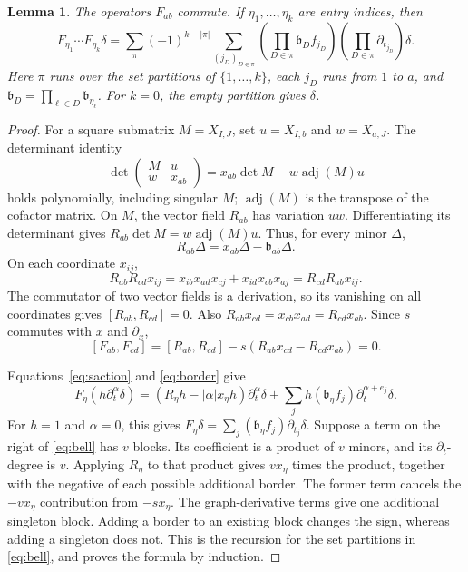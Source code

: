 \documentclass[11pt,a4paper]{article}
\numberwithin{equation}{section}
\newtheorem{lemma}[theorem]{Lemma}
\theoremstyle{definition}
\begin{document}
\begin{lemma}\label{lem:bell}
The operators $F_{ab}$ commute. If $\eta_1,\ldots,\eta_k$ are entry
indices, then
\begin{equation}\label{eq:bell}
F_{\eta_1}\cdots F_{\eta_k}\delta
=\sum_\pi(-1)^{k-|\pi|}
 \sum_{(j_D)_{D\in\pi}}
 \left(\prod_{D\in\pi}\mathfrak b_D f_{j_D}\right)
 \left(\prod_{D\in\pi}\partial_{t_{j_D}}\right)\delta.
\end{equation}
Here $\pi$ runs over the set partitions of $\{1,\ldots,k\}$,
each $j_D$ runs from $1$ to $a$, and
$\mathfrak b_D=\prod_{\ell\in D}\mathfrak b_{\eta_\ell}$.
For $k=0$, the empty partition gives $\delta$.
\end{lemma}
\begin{proof}
For a square submatrix $M=X_{I,J}$, set $u=X_{I,b}$ and
$w=X_{a,J}$. The determinant identity
\[
\det\begin{pmatrix}M&u\\w&x_{ab}\end{pmatrix}
=x_{ab}\det M-w\operatorname{adj}(M)u
\]
holds polynomially, including singular $M$; $\operatorname{adj}(M)$
is the transpose of the cofactor matrix. On $M$, the vector field
$R_{ab}$ has variation $uw$. Differentiating its determinant gives
$R_{ab}\det M=w\operatorname{adj}(M)u$. Thus, for every minor $\Delta$,
\begin{equation}\label{eq:border}
R_{ab}\Delta=x_{ab}\Delta-\mathfrak b_{ab}\Delta.
\end{equation}
On each coordinate $x_{ij}$,
\[
R_{ab}R_{cd}x_{ij}
=x_{ib}x_{ad}x_{cj}+x_{id}x_{cb}x_{aj}
=R_{cd}R_{ab}x_{ij}.
\]
The commutator of two vector fields is a derivation, so its vanishing
on all coordinates gives $[R_{ab},R_{cd}]=0$. Also
$R_{ab}x_{cd}=x_{cb}x_{ad}=R_{cd}x_{ab}$.
Since $s$ commutes with $x$ and $\partial_x$,
\[
[F_{ab},F_{cd}]
=[R_{ab},R_{cd}]-s(R_{ab}x_{cd}-R_{cd}x_{ab})=0.
\]

Equations~\eqref{eq:saction} and \eqref{eq:border} give
\[
F_\eta(h\partial_t^\alpha\delta)
=(R_\eta h-|\alpha|x_\eta h)\partial_t^\alpha\delta
 +\sum_jh(\mathfrak b_\eta f_j)\partial_t^{\alpha+e_j}\delta.
\]
For $h=1$ and $\alpha=0$, this gives
$F_\eta\delta=\sum_j(\mathfrak b_\eta f_j)\partial_{t_j}\delta$.
Suppose a term on the right of \eqref{eq:bell} has $v$ blocks. Its
coefficient is a product of $v$ minors, and its $\partial_t$-degree is
$v$. Applying $R_\eta$ to that product gives $v x_\eta$ times the
product, together with the negative of each possible additional
border. The former term cancels the $-v x_\eta$ contribution from
$-sx_\eta$. The graph-derivative terms give one additional singleton
block. Adding a border to an existing block changes the sign, whereas
adding a singleton does not. This is the recursion for the set
partitions in \eqref{eq:bell}, and proves the formula by induction.
\end{proof}
\end{document}
